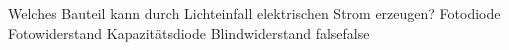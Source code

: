     {Welches Bauteil kann durch Lichteinfall elektrischen Strom erzeugen?}
    {Fotodiode}
    {Fotowiderstand}
    {Kapazitätsdiode}
    {Blindwiderstand}
    {false}{false}